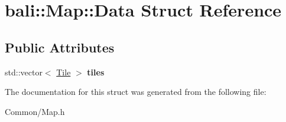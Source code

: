 \hypertarget{structbali_1_1_map_1_1_data}{\section{bali\-:\-:Map\-:\-:Data Struct Reference}
\label{structbali_1_1_map_1_1_data}
}
\subsection*{Public Attributes}
\begin{DoxyCompactItemize}
\item 
\hypertarget{structbali_1_1_map_1_1_data_ad9dd97dd099ea21416b3a51e127e9325}{std\-::vector$<$ \hyperlink{structbali_1_1_map_1_1_tile}{Tile} $>$ {\bfseries tiles}}\label{structbali_1_1_map_1_1_data_ad9dd97dd099ea21416b3a51e127e9325}

\end{DoxyCompactItemize}


The documentation for this struct was generated from the following file\-:\begin{DoxyCompactItemize}
\item 
Common/Map.\-h\end{DoxyCompactItemize}
